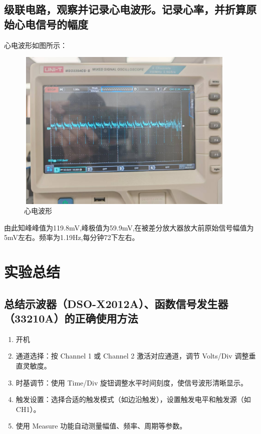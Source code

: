 \documentclass{article}
\begin{document}
\subsection{级联电路，观察并记录心电波形。记录心率，并折算原始心电信号的幅度}
心电波形如图所示：
\begin{figure}[htbp]
    \centering
    \includegraphics[width=300pt,height=220pt]{heart.jpg}
    \caption{心电波形}
\end{figure}
由此知峰峰值为119.8mV,峰极值为59.9mV,在被差分放大器放大前原始信号幅值为5mV左右。频率为1.19Hz,每分钟72下左右。

\section{实验总结}
\subsection{总结示波器（DSO-X2012A）、函数信号发生器（33210A）的正确使用方法}
\begin{enumerate}
    \item 开机
    \item 通道选择：按 Channel 1 或 Channel 2 激活对应通道，调节 Volts/Div 调整垂直灵敏度。
    \item 时基调节：使用 Time/Div 旋钮调整水平时间刻度，使信号波形清晰显示。
    \item 触发设置：选择合适的触发模式（如边沿触发），设置触发电平和触发源（如 CH1）。
    \item 使用 Measure 功能自动测量幅值、频率、周期等参数。
\end{enumerate}
\end{document}
